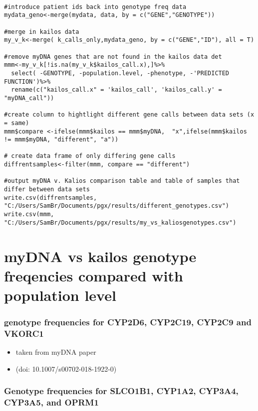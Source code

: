 \documentclass[]{article}
\providecommand{\tightlist}{%
  \setlength{\itemsep}{0pt}\setlength{\parskip}{0pt}}
\begin{document}
\begin{verbatim}

#introduce patient ids back into genotype freq data
mydata_geno<-merge(mydata, data, by = c("GENE","GENOTYPE"))

#merge in kailos data
my_v_k<-merge( k_calls_only,mydata_geno, by = c("GENE","ID"), all = T) 

#remove myDNA genes that are not found in the kailos data det 
mmm<-my_v_k[!is.na(my_v_k$kailos_call.x),]%>%
  select( -GENOTYPE, -population.level, -phenotype, -'PREDICTED FUNCTION')%>%
  rename(c("kailos_call.x" = 'kailos_call', 'kailos_call.y' = "myDNA_call"))

#create column to hightlight different gene calls between data sets (x = same)
mmm$compare <-ifelse(mmm$kailos == mmm$myDNA,  "x",ifelse(mmm$kailos != mmm$myDNA, "different", "a"))

# create data frame of only differing gene calls
diffrentsamples<-filter(mmm, compare == "different")

#output myDNA v. Kalios comparison table and table of samples that differ between data sets
write.csv(diffrentsamples, "C:/Users/SamBr/Documents/pgx/results/different_genotypes.csv")
write.csv(mmm, "C:/Users/SamBr/Documents/pgx/results/my_vs_kaliosgenotypes.csv")
\end{verbatim}

\section{myDNA vs kailos genotype freqencies compared with population
level}\label{mydna-vs-kailos-genotype-freqencies-compared-with-population-level}

\subsubsection{genotype frequencies for CYP2D6, CYP2C19, CYP2C9 and
VKORC1}\label{genotype-frequencies-for-cyp2d6-cyp2c19-cyp2c9-and-vkorc1}

\begin{itemize}
\tightlist
\item
  taken from myDNA paper
\item
  (doi: 10.1007/s00702-018-1922-0)
\end{itemize}

\subsubsection{Genotype frequencies for SLCO1B1, CYP1A2, CYP3A4, CYP3A5,
and
OPRM1}\label{genotype-frequencies-for-slco1b1-cyp1a2-cyp3a4-cyp3a5-and-oprm1}
\end{document}

